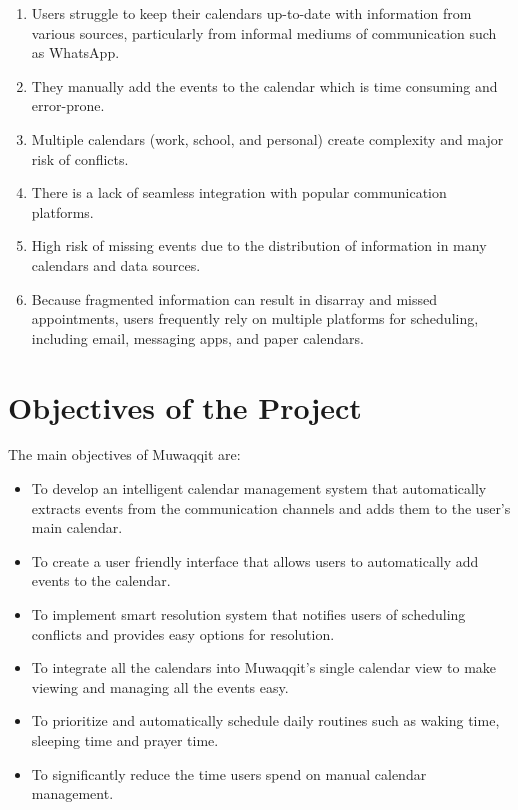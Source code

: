 \documentclass[12pt,a4paper]{article}
\begin{document}
\begin{enumerate}
    \item Users struggle to keep their calendars up-to-date with information from various sources, particularly from informal mediums of communication such as WhatsApp.
    \item They manually add the events to the calendar which is time consuming and error-prone.
    \item Multiple calendars (work, school, and personal) create complexity and major risk of conflicts.
    \item There is a lack of seamless integration with popular communication platforms.
    \item High risk of missing events due to the distribution of information in many calendars and data sources.
    \item Because fragmented information can result in disarray and missed appointments, users frequently rely on multiple platforms for scheduling, including email, messaging apps, and paper calendars.
\end{enumerate}

\section{Objectives of the Project}

The main objectives of Muwaqqit are:

\begin{itemize}
    \item To develop an intelligent calendar management system that automatically extracts events from the communication channels and adds them to the user's main calendar.
    \item To create a user friendly interface that allows users to automatically add events to the calendar.
    \item To implement smart resolution system that notifies users of scheduling conflicts and provides easy options for resolution.
    \item To integrate all the calendars into Muwaqqit's single calendar view to make viewing and managing all the events easy.
    \item To prioritize and automatically schedule daily routines such as waking time, sleeping time and prayer time.
    \item To significantly reduce the time users spend on manual calendar management.
\end{itemize}
\end{document}
